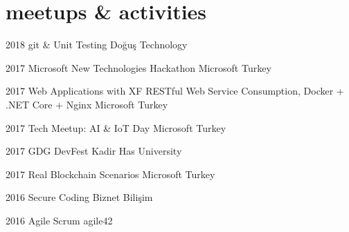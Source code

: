 \documentclass[]{../friggeri-cv} %
\begin{document}
\section{meetups \& activities}
\begin{entrylist}

\entry
{2018}
{git \& Unit Testing}
{}
{Doğuş Technology}

\entry
{2017}
{Microsoft New Technologies Hackathon}
{}
{Microsoft Turkey}

\entry
{2017}
{Web Applications with XF RESTful Web Service Consumption, Docker + .NET Core + Nginx}
{}
{Microsoft Turkey}

\entry
{2017}
{Tech Meetup: AI \& IoT Day}
{}
{Microsoft Turkey}

\entry
{2017}
{GDG DevFest}
{}
{Kadir Has University}

\entry
{2017}
{Real Blockchain Scenarios}
{}
{Microsoft Turkey}

\entry
{2016}
{Secure Coding}
{}
{Biznet Bilişim}

\entry
{2016}
{Agile Scrum}
{}
{agile42}

\end{entrylist}
\end{document}
